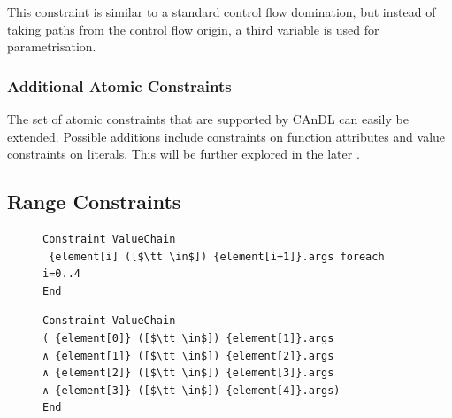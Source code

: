     \noindent
    This constraint is similar to a standard control flow domination, but
    instead of taking paths from the control flow origin, a third variable is
    used for parametrisation. 

\subsubsection{Additional Atomic Constraints}

    The set of atomic constraints that are supported by CAnDL can easily be
    extended.
    Possible additions include constraints on function attributes and value
    constraints on literals.
    This will be further explored in the later
    .

\subsection{Range Constraints}

\begin{figure}[t]
\begin{lstlisting}[language=CAnDL]
Constraint ValueChain
 {element[i] ([$\tt \in$]) {element[i+1]}.args foreach i=0..4
End
\end{lstlisting}
\begin{lstlisting}[language=CAnDL,label={fig:forall},caption=
   {Example for the expansion of range constraints in CAnDL:
    The specification at the top can be ``unrolled'' manually, resulting in the
    equivalent, but more verbose, specification below.\parfillskip=0pt}]
Constraint ValueChain
( {element[0]} ([$\tt \in$]) {element[1]}.args
∧ {element[1]} ([$\tt \in$]) {element[2]}.args
∧ {element[2]} ([$\tt \in$]) {element[3]}.args
∧ {element[3]} ([$\tt \in$]) {element[4]}.args)
End
\end{lstlisting}
\end{figure}


